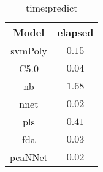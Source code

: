 \begin{table}[!ht]
	\centering
	\begin{tabular}{|c|c|}
		\hline
		Model & elapsed \\ \hline
		svmPoly & $0.15$ \\ \hline
		C5.0 & $0.04$ \\ \hline
		nb & $1.68$ \\ \hline
		nnet & $0.02$ \\ \hline
		pls & $0.41$ \\ \hline
		fda & $0.03$ \\ \hline
		pcaNNet & $0.02$ \\ \hline
	\end{tabular}
	\caption{time:predict}
	\label{tab:time:predict}
\end{table}
